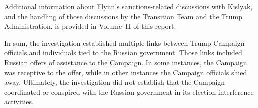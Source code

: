 Additional information about Flynn's sanctions-related discussions with Kislyak, and the handling of those discussions by the Transition Team and the Trump Administration, is provided in Volume~II of this report.

\hr

In sum, the investigation established multiple links between Trump Campaign officials and individuals tied to the Russian government.
Those links included Russian offers of assistance to the Campaign.
In some instances, the Campaign was receptive to the offer, while in other instances the Campaign officials shied away.
Ultimately, the investigation did not establish that the Campaign coordinated or conspired with the Russian government in its election-interference activities.
